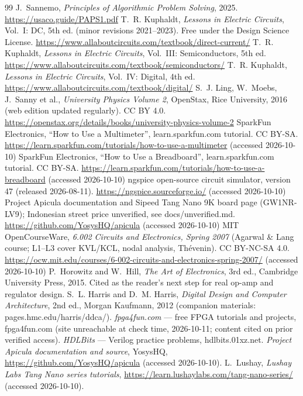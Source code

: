 \begin{thebibliography}{99}
 J.~Sannemo, \emph{Principles of Algorithmic Problem Solving}, 2025. \url{https://usaco.guide/PAPS1.pdf}
 T.~R. Kuphaldt, \emph{Lessons in Electric Circuits}, Vol.~I: DC, 5th ed. (minor revisions 2021--2023). Free under the Design Science License. \url{https://www.allaboutcircuits.com/textbook/direct-current/}
 T.~R. Kuphaldt, \emph{Lessons in Electric Circuits}, Vol.~III: Semiconductors, 5th ed. \url{https://www.allaboutcircuits.com/textbook/semiconductors/}
 T.~R. Kuphaldt, \emph{Lessons in Electric Circuits}, Vol.~IV: Digital, 4th ed. \url{https://www.allaboutcircuits.com/textbook/digital/}
 S.~J. Ling, W.~Moebs, J.~Sanny et al., \emph{University Physics Volume 2}, OpenStax, Rice University, 2016 (web edition updated regularly). CC BY 4.0. \url{https://openstax.org/details/books/university-physics-volume-2}
 SparkFun Electronics, ``How to Use a Multimeter'', learn.sparkfun.com tutorial. CC BY-SA. \url{https://learn.sparkfun.com/tutorials/how-to-use-a-multimeter} (accessed 2026-10-10)
 SparkFun Electronics, ``How to Use a Breadboard'', learn.sparkfun.com tutorial. CC BY-SA. \url{https://learn.sparkfun.com/tutorials/how-to-use-a-breadboard} (accessed 2026-10-10)
 ngspice open-source circuit simulator, version 47 (released 2026-08-11). \url{https://ngspice.sourceforge.io/} (accessed 2026-10-10)
 Project Apicula documentation and Sipeed Tang Nano 9K board page (GW1NR-LV9); Indonesian street price unverified, see docs/unverified.md. \url{https://github.com/YosysHQ/apicula} (accessed 2026-10-10)
 MIT OpenCourseWare, \emph{6.002 Circuits and Electronics, Spring 2007} (Agarwal \& Lang course; L1--L3 cover KVL/KCL, nodal analysis, Th\'evenin). CC BY-NC-SA 4.0. \url{https://ocw.mit.edu/courses/6-002-circuits-and-electronics-spring-2007/} (accessed 2026-10-10)
 P.~Horowitz and W.~Hill, \emph{The Art of Electronics}, 3rd ed., Cambridge University Press, 2015. Cited as the reader's next step for real op-amp and regulator design.
 S.~L. Harris and D.~M. Harris, \emph{Digital Design and Computer Architecture}, 2nd ed., Morgan Kaufmann, 2012 (companion materials: pages.hmc.edu/harris/ddca/).
 \emph{fpga4fun.com} --- free FPGA tutorials and projects, fpga4fun.com (site unreachable at check time, 2026-10-11; content cited on prior verified access).
 \emph{HDLBits} --- Verilog practice problems, hdlbits.01xz.net.
 \emph{Project Apicula documentation and source}, YosysHQ,
\url{https://github.com/YosysHQ/apicula} (accessed 2026-10-10).
 L.~Lushay, \emph{Lushay Labs Tang Nano series tutorials},
\url{https://learn.lushaylabs.com/tang-nano-series/} (accessed 2026-10-10).
\end{thebibliography}
